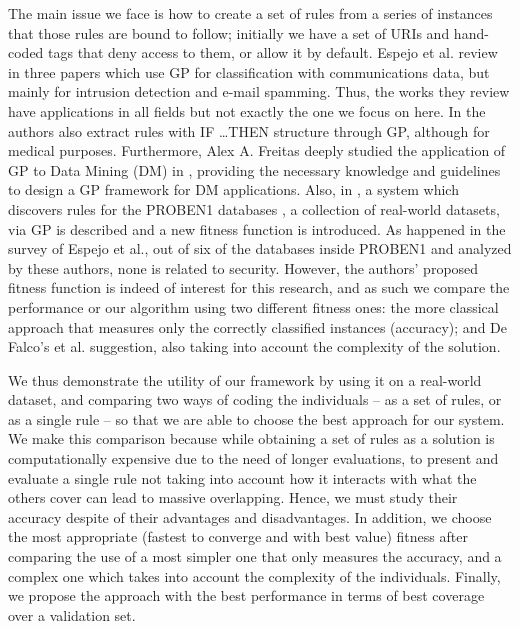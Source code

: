 \documentclass[runningheads]{llncs}
\begin{document}
The main issue we face is how to create a set of rules from a series
of instances that those rules are bound to follow; initially
we have a set of URIs and hand-coded tags that deny access to
them, or allow it by default.  Espejo et al. review in
\cite{espejo2010survey} three papers which use GP for classification
with communications data, but mainly for intrusion detection and
e-mail spamming. Thus, the works they review have applications in all
fields but not exactly the one we focus on here. In
\cite{Tsakonas2004195} the authors also extract rules with \textsc{IF
\ldots THEN} structure through GP, although for medical
purposes. Furthermore, Alex A. Freitas deeply studied the application
of GP to Data Mining (DM) in \cite{freitas2002data}, providing the
necessary knowledge and guidelines to design a GP framework for DM
applications. Also, in \cite{DeFalco2002257}, a system which discovers
rules for the PROBEN1 databases \cite{prechelt1994proben}, a
collection of real-world datasets, via GP is described and a new
fitness function is introduced. As happened in the survey of Espejo et
al., out of six of the databases inside PROBEN1 and analyzed by these
authors, none is related to security. However, the authors' proposed
fitness function is indeed of interest for this research, and as such we
compare the performance or our algorithm using two different fitness
ones: the more classical approach that measures only the
correctly classified instances (accuracy); and De Falco's et
al. \cite{DeFalco2002257} suggestion, also taking into account the
complexity of the solution.

We thus demonstrate the utility of our framework by using it on a
real-world dataset, and comparing two 
ways of coding the individuals -- as a set of rules, or as a single
rule -- so that we are able to choose the best approach for our
system. We make this comparison because while obtaining a set of rules
as a solution is computationally expensive due to the need of longer
evaluations, to present and evaluate a single rule not taking into
account how it interacts with what the others cover
\cite{freitas2002data} can lead to massive overlapping. Hence, we must
study their accuracy despite of their advantages and disadvantages. In
addition, we choose the most appropriate (fastest to converge and with
best value) fitness after comparing the use of a most simpler one that
only measures the accuracy, and a complex one which takes into account
the complexity of the individuals. Finally, we propose the approach
with the best performance in terms of best coverage over a validation
set.
\end{document}
